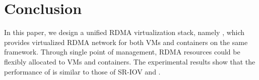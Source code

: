 \section{Conclusion} \label{conclusion}

In this paper, we design a unified RDMA virtualization stack, namely \sys, which provides virtualized RDMA network for both VMs and containers on the same framework.
Through single point of management, RDMA resources could be flexibly allocated to VMs and containers. %
The experimental results show that the performance of \sys is similar to those of SR-IOV and \native.

